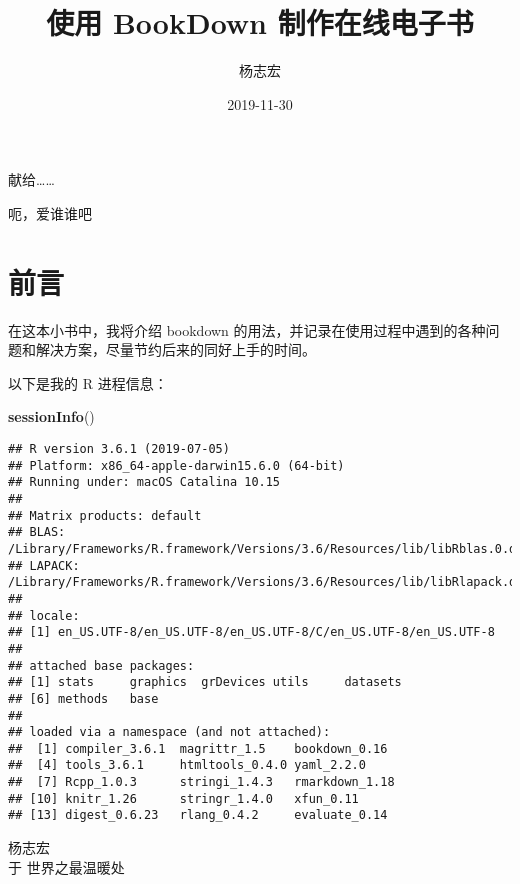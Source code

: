 \documentclass[]{ctexbook}
\title{使用 BookDown 制作在线电子书}
\author{杨志宏}
\date{2019-11-30}
\newenvironment{Shaded}{\begin{snugshade}}{\end{snugshade}}
\newcommand{\KeywordTok}[1]{\textcolor[rgb]{0.13,0.29,0.53}{\textbf{#1}}}
\newcommand{\NormalTok}[1]{#1}
\let\BeginKnitrBlock\begin \let\EndKnitrBlock\end
\begin{document}
\maketitle


\thispagestyle{empty}

\begin{center}
献给……

呃，爱谁谁吧
\end{center}

\setlength{\abovedisplayskip}{-5pt}
\setlength{\abovedisplayshortskip}{-5pt}

{
\setcounter{tocdepth}{2}
\tableofcontents
}
\listoftables
\listoffigures
\hypertarget{ux524dux8a00}{%
\chapter*{前言}\label{ux524dux8a00}}


在这本小书中，我将介绍 bookdown 的用法，并记录在使用过程中遇到的各种问题和解决方案，尽量节约后来的同好上手的时间。

以下是我的 R 进程信息：

\begin{Shaded}
\begin{Highlighting}[]
\KeywordTok{sessionInfo}\NormalTok{()}
\end{Highlighting}
\end{Shaded}

\begin{verbatim}
## R version 3.6.1 (2019-07-05)
## Platform: x86_64-apple-darwin15.6.0 (64-bit)
## Running under: macOS Catalina 10.15
## 
## Matrix products: default
## BLAS:   /Library/Frameworks/R.framework/Versions/3.6/Resources/lib/libRblas.0.dylib
## LAPACK: /Library/Frameworks/R.framework/Versions/3.6/Resources/lib/libRlapack.dylib
## 
## locale:
## [1] en_US.UTF-8/en_US.UTF-8/en_US.UTF-8/C/en_US.UTF-8/en_US.UTF-8
## 
## attached base packages:
## [1] stats     graphics  grDevices utils     datasets 
## [6] methods   base     
## 
## loaded via a namespace (and not attached):
##  [1] compiler_3.6.1  magrittr_1.5    bookdown_0.16  
##  [4] tools_3.6.1     htmltools_0.4.0 yaml_2.2.0     
##  [7] Rcpp_1.0.3      stringi_1.4.3   rmarkdown_1.18 
## [10] knitr_1.26      stringr_1.4.0   xfun_0.11      
## [13] digest_0.6.23   rlang_0.4.2     evaluate_0.14
\end{verbatim}

\BeginKnitrBlock{flushright}
杨志宏\\
于 世界之最温暖处
\EndKnitrBlock{flushright}
\end{document}
